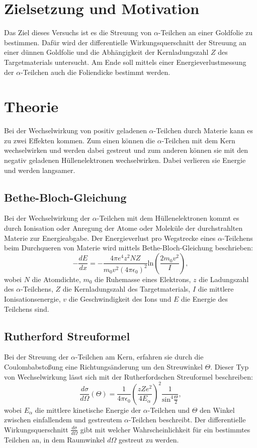 \section{Zielsetzung und Motivation}
\label{sec:ZielsetzungundMotivation}
Das Ziel dieses Versuchs ist es die Streuung von $\alpha$-Teilchen an einer Goldfolie zu bestimmen. Dafür wird der differentielle Wirkungsquerschnitt der Streuung an einer dünnen Goldfolie und die Abhängigkeit der Kernladungszahl $Z$ des Targetmaterials untersucht.
Am Ende soll mittels einer Energieverlustmessung der $\alpha$-Teilchen auch die Foliendicke bestimmt werden.

\section{Theorie}
\label{sec:Theorie}
Bei der Wechselwirkung von positiv geladenen $\alpha$-Teilchen durch Materie kann es zu zwei Effekten kommen. Zum einen können die $\alpha$-Teilchen mit dem Kern wechselwirken und werden dabei gestreut und zum anderen können sie mit den negativ geladenen Hüllenelektronen wechselwirken. Dabei verlieren sie Energie und werden langsamer. 

\subsection{Bethe-Bloch-Gleichung}
Bei der Wechselwirkung der $\alpha$-Teilchen mit dem Hüllenelektronen kommt es durch Ionisation oder Anregung der Atome oder Moleküle der durchstrahlten Materie zur Energieabgabe. Der Energieverlust pro Wegstrecke eines $\alpha$-Teilchens beim Durchqueren von Materie wird mittels Bethe-Bloch-Gleichung beschrieben:
\begin{equation}
\label{eq:bethebloch}
-\frac{dE}{dx} = - \frac{4 \pi e^4 z^2 N Z}{m_0 v^2 (4\pi\epsilon_0)^2}\text{ln}\left(\frac{2 m_0 v^2}{I}\right),
\end{equation}
wobei $N$ die Atomdichte, $m_0$ die Ruhemasse eines Elektrons, $z$ die Ladungszahl des $\alpha$-Teilchens, $Z$ die Kernladungszahl des Targetmaterials, $I$ die mittlere Ionisationsenergie, $v$ die Geschwindigkeit des Ions und $E$ die Energie des Teilchens sind.

\subsection{Rutherford Streuformel}
Bei der Streuung der $\alpha$-Teilchen am Kern, erfahren sie durch die Coulombabstoßung eine Richtungsänderung um den Streuwinkel $\Theta$. Dieser Typ von Wechselwirkung lässt sich mit der Rutherfordschen Streuformel beschreiben:
\begin{equation}
\frac{d\sigma}{d\Omega}(\Theta) = \frac{1}{4 \pi \epsilon_0} \left(\frac{z Z e^2}{4 E_\alpha}\right)^2 \frac{1}{\text{sin}^4 \frac{\Theta}{2}},
\end{equation}
wobei $E_\alpha$ die mittlere kinetische Energie der $\alpha$-Teilchen und $\Theta$ den Winkel zwischen einfallendem und gestreutem $\alpha$-Teilchen beschreibt. Der differentielle Wirkungsquerschnitt $\frac{d\sigma}{d\Omega}$ gibt mit welcher Wahrscheinlichkeit für ein bestimmtes Teilchen an, in dem Raumwinkel $d\Omega$ gestreut zu werden.